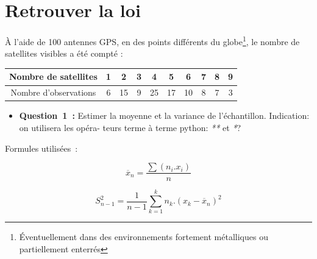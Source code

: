 \vspace{1cm}
\section{Retrouver la loi}
\vspace{.2cm}

\noindent
À l’aide de 100 antennes GPS, en des points différents du globe\footnote{Éventuellement dans des environnements fortement métalliques ou partiellement enterrés}, le nombre de satellites visibles a été
compté :

\begin{center}
    \begin{tabular}{| c | c | c | c | c | c | c | c | c | c |}
        \hline
        Nombre de satellites & 1 & 2 & 3 & 4 & 5 & 6 & 7 & 8 & 9  \\ \hline
        Nombre d’observations & 6 & 15 & 9 & 25 & 17 & 10 & 8 & 7 & 3 \\ \hline
    \end{tabular}
\end{center}


\vspace{.5cm}
\begin{itemize}[label={},itemindent=-2em,leftmargin=2em]
    \item \textbf{Question~1~:} Estimer la moyenne et la variance de l’échantillon. Indication: on utilisera les opéra-
    teurs terme à terme python: \textit{**} et \textit{*}?
\end{itemize}
\vspace{.2cm}

\noindent
Formules utilisées~:

\begin{figure}[!h]
    \centering
    \begin{minipage}{.48\linewidth}
        \begin{equation}
            \overline{x}_{n} = \frac{\sum{(n_{i}.x_{i})}}{n}
        \end{equation}
    \end{minipage}\hfill\vline
    \begin{minipage}{.48\linewidth}
        \begin{equation}
            S^{2}_{n-1} = \frac{1}{n-1} \sum^{k}_{k=1}{n_{k}.(x_{k}-\overline{x}_{n})^{2}}
        \end{equation}
    \end{minipage}
\end{figure}



